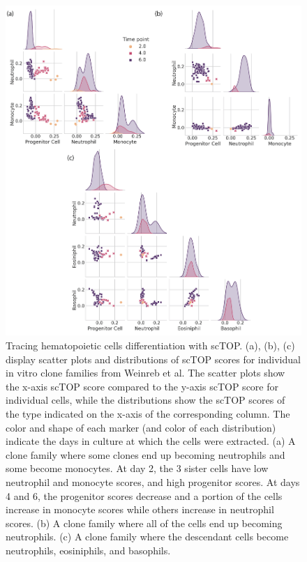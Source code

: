 \documentclass[aps,superscriptaddress, notitlepage,longbibliography]{revtex4-1}
\begin{document}
\begin{figure}
	\centering
		\includegraphics[scale=0.75]{figs/hem. clone families.png}
	\caption{Tracing hematopoietic cells differentiation with scTOP. (a), (b), (c) display scatter plots and distributions of scTOP scores for individual in vitro clone families from Weinreb et al. The scatter plots show the x-axis scTOP score compared to the y-axis scTOP score for individual cells, while the distributions show the scTOP scores of the type indicated on the x-axis of the corresponding column. The color and shape of each marker (and color of each distribution) indicate the days in culture at which the cells were extracted. (a) A clone family where some clones end up becoming neutrophils and some become monocytes. At day 2, the 3 sister cells have low neutrophil and monocyte scores, and high progenitor scores. At days 4 and 6, the progenitor scores decrease and a portion of the cells increase in monocyte scores while others increase in neutrophil scores. (b) A clone family where all of the cells end up becoming neutrophils. (c) A clone family where the descendant cells become neutrophils, eosiniphils, and basophils.}
	\label{hem clones}
\end{figure}
\end{document}
